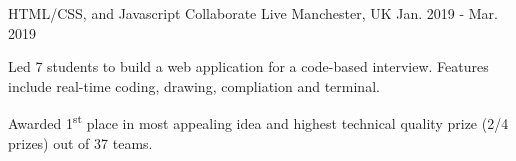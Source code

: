 \begin{cventries}
    \cventry
    {HTML/CSS, and Javascript} %
    {Collaborate Live} %
    {Manchester, UK} %
    {Jan. 2019 - Mar. 2019} %
    {
      \begin{cvitems} %
        \item {Led 7 students to build a web application for a code-based interview. Features include real-time coding, drawing, compliation and terminal.}
        \item {Awarded 1\textsuperscript{st} place in most appealing idea and highest technical quality prize (2/4 prizes) out of 37 teams.}
      \end{cvitems}
    }





\end{cventries}
